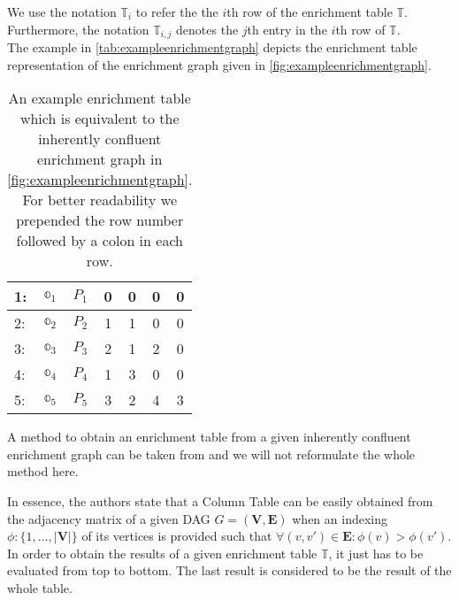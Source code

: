 We use the notation $\mathbb{T}_i$ to refer the the $i$th row of the enrichment table $\mathbb{T}$.
Furthermore, the notation $\mathbb{T}_{i,j}$ denotes the $j$th entry in the $i$th row of $\mathbb{T}$.\\

The example in \autoref{tab:exampleenrichmentgraph} depicts the enrichment table representation of the enrichment graph given in \autoref{fig:exampleenrichmentgraph}.\\

\begin{table}[tb]
\caption[Example enrichment table]{An example enrichment table which is equivalent to the inherently confluent enrichment graph in \autoref{fig:exampleenrichmentgraph}. For better readability we prepended the row number followed by a colon in each row.}
\centering
\begin{tabular}{lc|c|c|c|c|c}
  1: & $\mathbb{o}_1$ & $P_1$ & 0 & 0 & 0 & 0\\ \hline
  2: & $\mathbb{o}_2$ & $P_2$ & 1 & 1 & 0 & 0\\ \hline
  3: & $\mathbb{o}_3$ & $P_3$ & 2 & 1 & 2 & 0\\ \hline
  4: & $\mathbb{o}_4$ & $P_4$ & 1 & 3 & 0 & 0\\ \hline
  5: & $\mathbb{o}_5$ & $P_5$ & 3 & 2 & 4 & 3
\end{tabular}
\label{tab:exampleenrichmentgraph}
\end{table}

A method to obtain an enrichment table from a given inherently confluent enrichment graph can be taken from \cite{kvasnieka:1998a} and we will not reformulate the whole method here.

In essence, the authors state that a Column Table can be easily obtained from the adjacency matrix of a given \ac{DAG} $G=(\mathbf{V},\mathbf{E})$  when an indexing $\phi \colon \{1,\dots,|\mathbf{V}|\}$ of its vertices is provided such that $\forall(v,v')\in \mathbf{E} \colon \phi(v) > \phi(v')$.\\


In order to obtain the results of a given enrichment table $\mathbb{T}$, it just has to be evaluated from top to bottom.
The last result is considered to be the result of the whole table.

